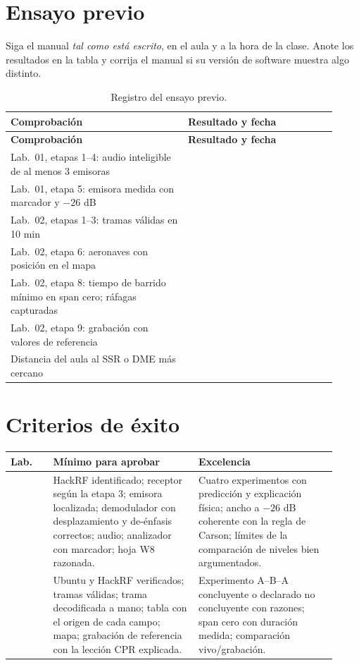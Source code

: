 \section{Ensayo previo}
\label{sec:i-ensayo}

Siga el manual \emph{tal como está escrito}, en el aula y a la hora de la clase. Anote los resultados en la tabla y corrija el manual si su versión de software muestra algo distinto.

\begin{longtable}{@{}>{\raggedright\arraybackslash}p{0.50\linewidth}>{\raggedright\arraybackslash}p{0.42\linewidth}@{}}
\caption{Registro del ensayo previo.}\label{tab:i-ensayo}\\
\toprule
\textbf{Comprobación} & \textbf{Resultado y fecha} \\
\midrule
\endfirsthead
\toprule
\textbf{Comprobación} & \textbf{Resultado y fecha} \\
\midrule
\endhead
Lab.\ 01, etapas 1--4: audio inteligible de al menos 3 emisoras & \\[2mm]
Lab.\ 01, etapa 5: emisora medida con marcador y $-26$ dB & \\[2mm]
Lab.\ 02, etapas 1--3: tramas válidas en 10 min & \\[2mm]
Lab.\ 02, etapa 6: aeronaves con posición en el mapa & \\[2mm]
Lab.\ 02, etapa 8: tiempo de barrido mínimo en span cero; ráfagas capturadas & \\[2mm]
Lab.\ 02, etapa 9: grabación con valores de referencia & \\[2mm]
Distancia del aula al SSR o DME más cercano & \\[2mm]
\bottomrule
\end{longtable}

\section{Criterios de éxito}

\begin{longtable}{@{}>{\raggedright\arraybackslash}p{0.12\linewidth}>{\raggedright\arraybackslash}p{0.41\linewidth}>{\raggedright\arraybackslash}p{0.39\linewidth}@{}}
\toprule
\textbf{Lab.} & \textbf{Mínimo para aprobar} & \textbf{Excelencia} \\
\midrule
\endhead
01 & HackRF identificado; receptor según la etapa 3; emisora localizada; demodulador con desplazamiento y de-énfasis correctos; audio; analizador con marcador; hoja W8 razonada. & Cuatro experimentos con predicción y explicación física; ancho a $-26$ dB coherente con la regla de Carson; límites de la comparación de niveles bien argumentados. \\
02 & Ubuntu y HackRF verificados; tramas válidas; trama decodificada a mano; tabla con el origen de cada campo; mapa; grabación de referencia con la lección CPR explicada. & Experimento A--B--A concluyente o declarado no concluyente con razones; span cero con duración medida; comparación vivo/grabación. \\
\bottomrule
\end{longtable}

